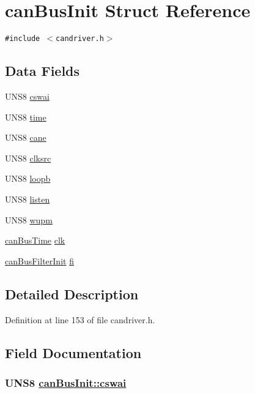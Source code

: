 \hypertarget{structcanBusInit}{
\section{can\-Bus\-Init Struct Reference}
\label{structcanBusInit}
}
{\tt \#include $<$candriver.h$>$}

\subsection*{Data Fields}
\begin{CompactItemize}
\item 
UNS8 \hyperlink{structcanBusInit_28a919ea372601ea997ffd7665a31300}{cswai}
\item 
UNS8 \hyperlink{structcanBusInit_85a64136e89c9106116e635487c8dbf8}{time}
\item 
UNS8 \hyperlink{structcanBusInit_89208e27db0d71c7b4c34b396d8e4494}{cane}
\item 
UNS8 \hyperlink{structcanBusInit_15fa5be003dd5961e7926d75bd405058}{clksrc}
\item 
UNS8 \hyperlink{structcanBusInit_b12f39cd4161fdc5ad130b4bb8e4a484}{loopb}
\item 
UNS8 \hyperlink{structcanBusInit_9b6d43ba9be72e1f21e234d50a1676d6}{listen}
\item 
UNS8 \hyperlink{structcanBusInit_ae0d3c3a91c165a0d782ff40be2e8e29}{wupm}
\item 
\hyperlink{structcanBusTime}{can\-Bus\-Time} \hyperlink{structcanBusInit_fc9eb7ca2f89001dca552e3f956beb73}{clk}
\item 
\hyperlink{structcanBusFilterInit}{can\-Bus\-Filter\-Init} \hyperlink{structcanBusInit_ea84b860ae3e0e636b78d1c83e916ea0}{fi}
\end{CompactItemize}


\subsection{Detailed Description}




Definition at line 153 of file candriver.h.

\subsection{Field Documentation}
\hypertarget{structcanBusInit_28a919ea372601ea997ffd7665a31300}{
\subsubsection[cswai]{\setlength{\rightskip}{0pt plus 5cm}UNS8 \hyperlink{structcanBusInit_28a919ea372601ea997ffd7665a31300}{can\-Bus\-Init::cswai}}}
\label{structcanBusInit_28a919ea372601ea997ffd7665a31300}




